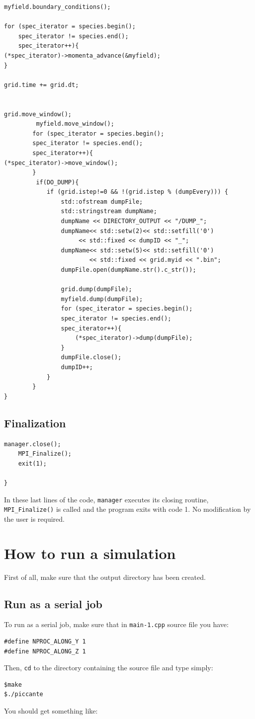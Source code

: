 \documentclass[11pt,a4paper]{report}
\begin{document}
\begin{lstlisting}[backgroundcolor=\color{no_modify}]
myfield.boundary_conditions();

for (spec_iterator = species.begin(); 
	spec_iterator != species.end(); 
	spec_iterator++){
(*spec_iterator)->momenta_advance(&myfield);
}

grid.time += grid.dt;


grid.move_window();
         myfield.move_window();
        for (spec_iterator = species.begin(); 
        spec_iterator != species.end(); 
        spec_iterator++){
(*spec_iterator)->move_window();
        }
         if(DO_DUMP){
            if (grid.istep!=0 && !(grid.istep % (dumpEvery))) {
                std::ofstream dumpFile;
                std::stringstream dumpName;
                dumpName << DIRECTORY_OUTPUT << "/DUMP_";
                dumpName<< std::setw(2)<< std::setfill('0') 
               		 << std::fixed << dumpID << "_";
                dumpName<< std::setw(5)<< std::setfill('0') 
                		<< std::fixed << grid.myid << ".bin";
                dumpFile.open(dumpName.str().c_str());

                grid.dump(dumpFile);
                myfield.dump(dumpFile);
                for (spec_iterator = species.begin(); 
                spec_iterator != species.end(); 
                spec_iterator++){
                    (*spec_iterator)->dump(dumpFile);
                }
                dumpFile.close();
                dumpID++;
            }
        }
}
\end{lstlisting}

\section{Finalization}
\begin{lstlisting}[backgroundcolor=\color{no_modify}]
	manager.close();
	MPI_Finalize();
	exit(1);

}
\end{lstlisting}
In these last lines of the code, \verb+manager+ executes its closing routine, \verb+MPI_Finalize()+ is called and the program exits with code 1. No modification by the user is required.\\



\chapter{How to run a simulation}\label{chapter_run}
First of all, make sure that the output directory has been created.
\section{Run as a serial job}
To run as a serial job, make sure that in \verb+main-1.cpp+ source file you have:
\begin{lstlisting}
#define NPROC_ALONG_Y 1
#define NPROC_ALONG_Z 1
\end{lstlisting}
Then, \verb+cd+ to the directory containing the source file and type simply:
\begin{verbatim}
$make
$./piccante
\end{verbatim}
You should get something like:
\end{document}
